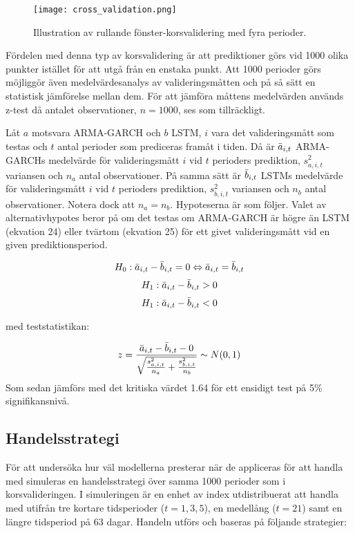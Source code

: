 \documentclass[11pt]{article}
\begin{document}
\begin{figure}[H]
\caption{Illustration av rullande fönster-korsvalidering med fyra perioder.}
\texttt{[image: cross\_validation.png]}
\centering
\end{figure}


Fördelen med denna typ av korsvalidering är att prediktioner görs vid 1000 olika punkter istället för att utgå från en enstaka punkt. Att 1000 perioder görs möjliggör även medelvärdesanalys av valideringsmåtten och på så sätt en statistisk jämförelse mellan dem. För att jämföra måttens medelvärden används z-test då antalet observationer, $n=1000$, ses som tillräckligt.

Låt $a$ motsvara ARMA-GARCH och $b$ LSTM, $i$ vara det valideringsmått som testas och $t$ antal perioder som prediceras framåt i tiden. Då är $\Bar{a}_{i,t}$ ARMA-GARCHs medelvärde för valideringsmått $i$ vid $t$ perioders prediktion, $s_{a,i,t}^2$ variansen och $n_a$ antal observationer. På samma sätt är  $\Bar{b}_{i,t}$ LSTMs medelvärde för valideringsmått $i$ vid $t$ perioders prediktion, $s_{b,i,t}^2$ variansen och $n_b$ antal observationer. Notera dock att $n_a = n_b$. Hypoteserna är som följer. Valet av alternativhypotes beror på om det testas om ARMA-GARCH är högre än LSTM (ekvation 24) eller tvärtom (ekvation 25) för ett givet valideringsmått vid en given prediktionsperiod. 

\begin{equation}
    H_0: \Bar{a}_{i,t} - \Bar{b}_{i,t} = 0 \Leftrightarrow \Bar{a}_{i,t} = \Bar{b}_{i,t}
\end{equation}
\begin{equation}
    H_1: \Bar{a}_{i,t} - \Bar{b}_{i,t} > 0
\end{equation}
\begin{equation}
    H_1: \Bar{a}_{i,t} - \Bar{b}_{i,t} < 0
\end{equation}

med teststatistikan: 

\begin{equation}
    z = \frac{\Bar{a}_{i,t} - \Bar{b}_{i,t} - 0}{\sqrt{\frac{s_{a,i,t}^2}{n_a}+\frac{s_{b,i,t}^2}{n_b}}} \sim N(0,1)
\end{equation}
Som sedan jämförs med det kritiska värdet 1.64 för ett ensidigt test på 5\% signifikansnivå.


\subsection{Handelsstrategi}
För att undersöka hur väl modellerna presterar när de appliceras för att handla med simuleras en handelsstrategi över samma 1000 perioder som i korsvalideringen. I simuleringen är en enhet av index utdistribuerat att handla med utifrån tre kortare tidsperioder ($t=1,3,5$), en medellång ($t=21$) samt en längre tidsperiod på 63 dagar. Handeln utförs och baseras på följande strategier:
\end{document}
